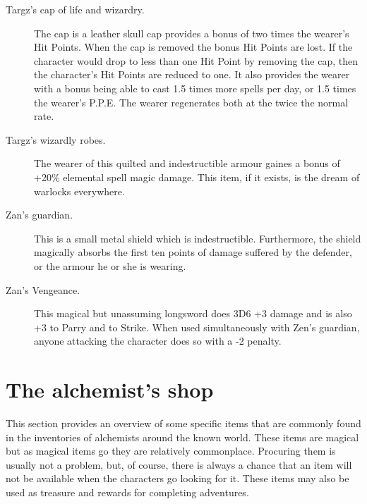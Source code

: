 \begin{description}
\item[Targz's cap of life and wizardry.]
The
cap
is a
leather skull cap provides a bonus of two times the wearer's Hit Points.
When the cap is removed the bonus Hit Points are lost.
If the character would drop to less than one Hit Point by removing the cap,
then the character's Hit Points are reduced to one.
It also provides the wearer with a bonus being able to cast 1.5 times more spells
per day, or 1.5 times the wearer's P.P.E.
The wearer regenerates both at the twice the normal rate.

\item[Targz's wizardly robes.]
The wearer of this quilted and indestructible armour
gaines a bonus of +20\% elemental spell magic damage.
This item, if it exists, is the dream of warlocks everywhere.

\item[Zan's guardian.]
This is a small metal shield which is indestructible.
Furthermore, the shield magically absorbs the first ten
points of damage
suffered by the defender, or the armour he or she
is wearing.

\item[Zan's Vengeance.] This magical
but unassuming longsword
does 3D6 +3 damage and is also +3 to Parry and to Strike.
When used simultaneously with Zen's guardian,
anyone attacking the character does so with a -2
penalty.
\end{description}

\section{The alchemist's shop}
This section provides an overview of some specific items
that are commonly found in the inventories of alchemists
around the known world.
These items are magical but as magical items go they are
relatively commonplace.
Procuring them is usually not a problem,
but,
of course,
there is always a chance that an item will not be available
when the characters go looking for it.
These items may also be used as treasure and rewards for
completing adventures.

